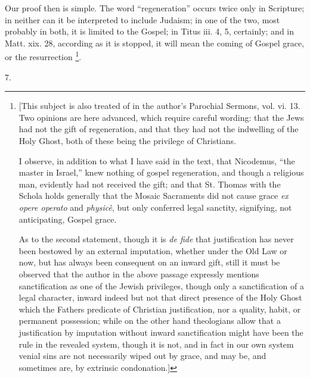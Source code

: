 Our proof then is simple. The word ``regeneration''
occurs twice only in Scripture; in neither can it be interpreted to
include Judaism; in one of the two, most probably in both, it is
limited to the Gospel; in Titus iii. 4, 5, certainly; and in Matt. xix.
28, according as it is stopped, it will mean the coming of Gospel
grace, or the resurrection \footnote{[This subject is also treated of in the author's Parochial Sermons,
vol. vi. 13. Two opinions are here advanced, which require careful
wording: that the Jews had not the gift of regeneration, and that they
had not the indwelling of the Holy Ghost, both of these being the
privilege of Christians.

I observe, in addition to what I have said in the
text, that Nicodemus, ``the master in Israel,'' knew nothing of gospel
regeneration, and though a religious man, evidently had not received
the gift; and that St. Thomas with the Schola holds generally that the
Mosaic Sacraments did not cause grace \emph{ex opere operato} and \emph{physicè},
but only conferred legal sanctity, signifying, not anticipating,
Gospel grace.

As to the second statement, though it is \emph{de
fide} that justification has never been bestowed by an external
imputation, whether under the Old Law or now, but has always been
consequent on an inward gift, still it must be observed that the
author in the above passage expressly mentions sanctification as one
of the Jewish privileges, though only a sanctification of a legal
character, inward indeed but not that direct presence of the Holy
Ghost which the Fathers predicate of Christian justification, nor a
quality, habit, or permanent possession; while on the other hand
theologians allow that a justification by imputation without inward
sanctification might have been the rule in the revealed system, though
it is not, and in fact in our own system venial sins are not
necessarily wiped out by grace, and may be, and sometimes are, by
extrinsic condonation.]}.

7.

